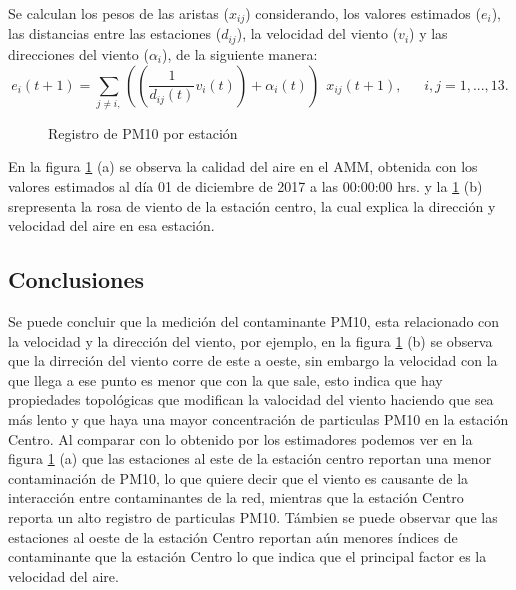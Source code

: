 \documentclass[a4paper, 11pt]{article}
\begin{document}
Se calculan los pesos de las aristas ($x_{ij}$) considerando, los valores estimados ($e_{i}$), las distancias entre las estaciones ($d_{ij}$), la velocidad del viento ($v_{i}$) y las direcciones del viento ($\alpha_{i}$), de la siguiente manera:
$$ e_{i}(t+1) = \sum_{j \neq i,} ((\frac{1}{d_{ij}(t)} v_{i}(t)) + \alpha_{i}(t)) \ \ x_{ij}(t+1), \ \ \ \ \ \ \ i,j = 1, ..., 13. $$


\begin{figure}[H]
\centering
{}
\caption{Registro de PM10 por estación}
\label{figure4}
\end{figure}
 En la figura \ref{figure4} (a) se observa la calidad del aire en el AMM, obtenida con los valores estimados al día 01 de diciembre de 2017 a las 00:00:00 hrs. y la  \ref{figure4} (b) srepresenta la rosa de viento de la estación centro, la cual explica la dirección y velocidad del aire en esa estación.

\subsection*{Conclusiones}

Se puede concluir que la medición del contaminante PM10, esta relacionado con la velocidad y la dirección del viento, por ejemplo, en la figura \ref{figure4} (b) se observa que la dirreción del viento corre de este a oeste, sin embargo la velocidad con la que llega a ese punto es menor que con la que sale, esto indica que hay propiedades topológicas que modifican la valocidad del viento haciendo que sea más lento y que haya una mayor concentración de particulas PM10 en la estación Centro. Al comparar con lo obtenido por los estimadores podemos ver en la figura  \ref{figure4} (a) que las estaciones al este de la estación centro reportan una menor contaminación de PM10, lo que quiere decir que el viento es causante de la interacción entre contaminantes de la red, mientras que la estación Centro reporta un alto registro de particulas PM10. Támbien se puede observar que las estaciones al oeste de la estación Centro reportan aún menores índices de contaminante que  la estación Centro lo que indica que el principal factor es la velocidad del aire.




\nocite{*}
\end{document}
